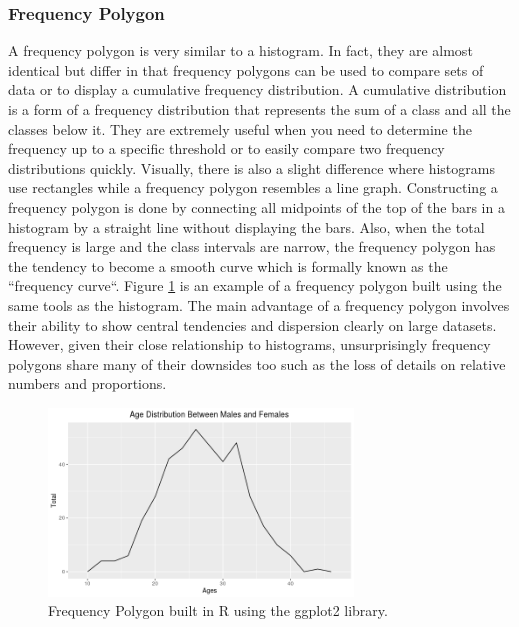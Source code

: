 \subsubsection{Frequency Polygon}
A frequency polygon is very similar to a histogram. In fact, they are almost 
identical but differ in that frequency polygons can be used to compare sets of data or 
to display a cumulative frequency distribution. A cumulative distribution is a 
form of a frequency distribution that represents the sum of a class and all the
classes below it. They are extremely useful when you need to determine the frequency 
up to a specific threshold or to easily compare two frequency distributions quickly.
Visually, there is also a slight difference where histograms use rectangles 
while a frequency polygon resembles a line graph. Constructing a frequency polygon 
is done by connecting all midpoints of the top of the bars in a histogram by a 
straight line without displaying the bars. Also, when the total frequency is large 
and the class intervals are narrow, the frequency polygon has the tendency to become 
a smooth curve which is formally known as the ``frequency curve``. Figure \ref{figure:freq_polygon}
is an example of a frequency polygon built using the same tools as the histogram. The 
main advantage of a frequency polygon involves their ability to show central 
tendencies and dispersion clearly on large datasets. However, given their close 
relationship to histograms, unsurprisingly frequency polygons share many of their 
downsides too such as the loss of details on relative numbers and proportions. 

\begin{figure}[H]
    \centering
        \includegraphics[height=5cm]{figures/freq_polygon.png}
    \caption{Frequency Polygon built in R using the ggplot2 library.}
    \label{figure:freq_polygon}
\end{figure}  

